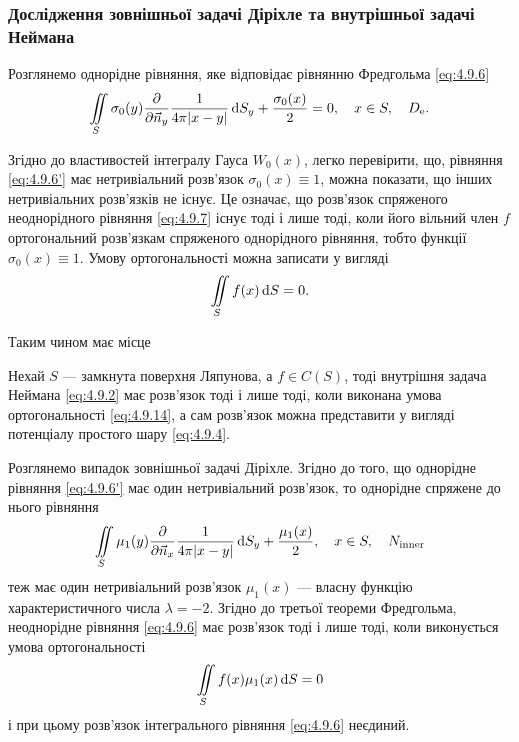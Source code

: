 \subsubsection{Дослідження зовнішньої задачі Діріхле та внутрішньої задачі Неймана}

Розглянемо однорідне рівняння, яке відповідає рівнянню Фредгольма \eqref{eq:4.9.6}
\begin{equation}
	\label{eq:4.9.6'}
	\displaystyle\iint\limits_S \sigma_0(y) \frac{\partial}{\partial \vec n_y} \frac{1}{4 \pi |x - y|} \mathop{}\!\mathrm{d} S_y + \frac{\sigma_0(x)}{2} = 0, \quad x \in S, \quad D_{\text{e}}.
\end{equation}

Згідно до властивостей інтегралу Гауса $W_0(x)$, легко перевірити, що, рівняння \eqref{eq:4.9.6'} має нетривіальний розв'язок $\sigma_0(x) \equiv 1$, можна показати, що інших нетривіальних розв'язків не існує. Це означає, що розв'язок спряженого неоднорідного рівняння \eqref{eq:4.9.7} існує тоді і лише тоді, коли його вільний член $f$ ортогональний розв'язкам спряженого однорідного рівняння, тобто функції $\sigma_0(x) \equiv 1$. Умову ортогональності можна записати у вигляді 
\begin{equation}
	\label{eq:4.9.14}
	\displaystyle\iint\limits_S f(x) \mathop{}\!\mathrm{d} S = 0.
\end{equation}

Таким чином має місце

\begin{theorem}
	Нехай $S$ --- замкнута поверхня Ляпунова, а $f \in C(S)$, тоді внутрішня задача Неймана \eqref{eq:4.9.2} має розв'язок тоді і лише тоді, коли виконана умова ортогональності \eqref{eq:4.9.14}, а сам розв'язок можна представити у вигляді потенціалу простого шару \eqref{eq:4.9.4}.
\end{theorem}

Розглянемо випадок зовнішньої задачі Діріхле. Згідно до того, що однорідне рівняння \eqref{eq:4.9.6'} має один нетривіальний розв'язок, то однорідне спряжене до нього рівняння
\begin{equation}
	\label{eq:4.9.7'}
	\displaystyle\iint\limits_S \mu_1(y) \frac{\partial}{\partial \vec n_x} \frac{1}{4 \pi |x - y|} \mathop{}\!\mathrm{d} S_y + \frac{\mu_1(x)}{2}, \quad x \in S, \quad N_{\text{inner}}
\end{equation}
теж має один нетривіальний розв'язок $\mu_1(x)$ --- власну функцію характеристичного числа $\lambda = -2$. Згідно до третьої теореми Фредгольма, неоднорідне рівняння \eqref{eq:4.9.6} має розв'язок тоді і лише тоді, коли виконується умова ортогональності
\begin{equation}
	\displaystyle\iint\limits_S f(x) \mu_1(x) \mathop{}\!\mathrm{d} S = 0
\end{equation}
і при цьому розв'язок інтегрального рівняння \eqref{eq:4.9.6} неєдиний. \medskip

